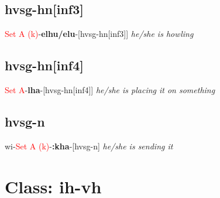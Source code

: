 \documentclass[oneside,openany]{book}%
\begin{document}
\subsection*{hvsg-hn[inf3]}%
\textcolor{Red}{Set A (k)}{-}\textbf{elhu/elu}{-}[hvsg-hn[inf3]] \textit{ he/she is howling} \\%
\vspace{1em}%
\needspace{1in}%
\subsection*{hvsg-hn[inf4]}%
\textcolor{Red}{Set A}{-}\textbf{lha}{-}[hvsg-hn[inf4]] \textit{ he/she is placing it on something} \\%
\vspace{1em}%
\needspace{1in}%
\subsection*{hvsg-n}%
wi{-}\textcolor{Red}{Set A (k)}{-}\textbf{:kha}{-}[hvsg-n] \textit{ he/she is sending it} \\%
\vspace{1em}%
\needspace{3in}%
\section*{Class: ih-vh}%
%
\needspace{1in}%
\end{document}
